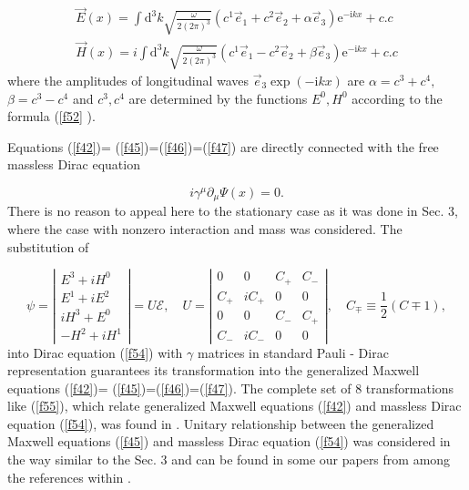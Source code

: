 \documentclass[a4paper,12pt]{article}
\begin{document}
\begin{equation}
\begin{array}{c}
\overrightarrow{E}\left( x\right) =\int \mathrm{d}^3k\sqrt{\frac \omega
{2\left( 2\pi \right) ^3}}\left( c^1\overrightarrow{e}_1+c^2\overrightarrow{e%
}_2+\alpha \overrightarrow{e}_3\right) \mathrm{e}^{-\mathrm{i}kx}+c.c \\
\overrightarrow{H}\left( x\right) =i\int \mathrm{d}^3k\sqrt{\frac \omega
{2\left( 2\pi \right) ^3}}\left( c^1\overrightarrow{e}_1-c^2\overrightarrow{e%
}_2+\beta \overrightarrow{e}_3\right) \mathrm{e}^{-\mathrm{i}kx}+c.c
\end{array}
\label{f53}
\end{equation}
where the amplitudes of longitudinal waves $\overrightarrow{e}_3\exp \left( -%
\mathrm{i}kx\right) $ are $\alpha =c^3+c^4,$ $\beta =c^3-c^4$ and $c^3,c^4$
are determined by the functions $E^0,H^0$ according to the formula (\ref{f52}%
).

Equations (\ref{f42})= (\ref{f45})=(\ref{f46})=(\ref{f47}) are directly
connected with the free massless Dirac equation

\begin{equation}
i\gamma ^\mu \partial _\mu \Psi (x)=0.  \label{f54}
\end{equation}
There is no reason to appeal here to the stationary case as it was done in
Sec. 3, where the case with nonzero interaction and mass was considered. The
substitution of

\begin{equation}
\psi =\left|
\begin{array}{c}
E^3+iH^0 \\
E^1+iE^2 \\
iH^3+E^0 \\
-H^2+iH^1
\end{array}
\right| =U\mathcal{E},\quad U=\left|
\begin{array}{cccc}
0 & 0 & C_{+} & C_{-} \\
C_{+} & iC_{+} & 0 & 0 \\
0 & 0 & C_{-} & C_{+} \\
C_{-} & iC_{-} & 0 & 0
\end{array}
\right| ,\quad C_{\mp }\equiv \frac 12(C\mp 1),  \label{f55}
\end{equation}
into Dirac equation (\ref{f54}) with $\gamma $ matrices in standard Pauli -
Dirac representation guarantees its transformation into the generalized
Maxwell equations (\ref{f42})= (\ref{f45})=(\ref{f46})=(\ref{f47}). The
complete set of 8 transformations like (\ref{f55}), which relate generalized
Maxwell equations (\ref{f42}) and massless Dirac equation (\ref{f54}), was
found in \cite{S2}. Unitary relationship between the generalized Maxwell
equations (\ref{f45}) and massless Dirac equation (\ref{f54}) was considered
in the way similar to the Sec. 3 and can be found in some our papers from
among the references within \cite{S2}.
\end{document}
